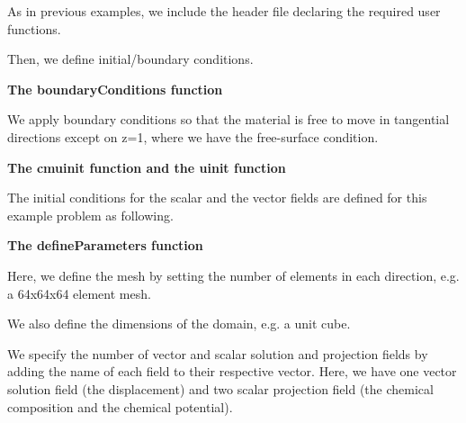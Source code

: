  As in previous examples, we include the header file declaring the required user functions.


\begin{DoxyCodeInclude}

\end{DoxyCodeInclude}


Then, we define initial/boundary conditions.

{\bfseries  The {\ttfamily boundary\-Conditions} function }

We apply boundary conditions so that the material is free to move in tangential directions except on z=1, where we have the free-\/surface condition.


\begin{DoxyCodeInclude}

\end{DoxyCodeInclude}


{\bfseries  The {\ttfamily cmuinit} function and the {\ttfamily uinit} function }

The initial conditions for the scalar and the vector fields are defined for this example problem as following.


\begin{DoxyCodeInclude}

\end{DoxyCodeInclude}



\begin{DoxyCodeInclude}

\end{DoxyCodeInclude}


{\bfseries  The {\ttfamily define\-Parameters} function }

Here, we define the mesh by setting the number of elements in each direction, e.\-g. a 64x64x64 element mesh.


\begin{DoxyCodeInclude}

\end{DoxyCodeInclude}


We also define the dimensions of the domain, e.\-g. a unit cube.


\begin{DoxyCodeInclude}

\end{DoxyCodeInclude}


We specify the number of vector and scalar solution and projection fields by adding the name of each field to their respective vector. Here, we have one vector solution field (the displacement) and two scalar projection field (the chemical composition and the chemical potential).


